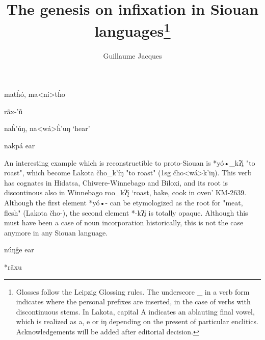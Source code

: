 \documentclass[oneside,a4paper,11pt]{article}
\newcommand{\ipa}[1]{{\phon#1}} %
\begin{document}
 

\title{The genesis on infixation in Siouan languages\footnote{Glosses follow the Leipzig Glossing rules. The underscore \_ in a verb form indicates where the personal prefixes are inserted, in the case of verbs with discontinuous stems. In Lakota, capital \ipa{A} indicates an ablauting final vowel, which is realized as \ipa{a}, \ipa{e} or \ipa{iŋ} depending on the present of particular enclitics. Acknowledgements will be added after editorial decision.}} 
 \author{Guillaume Jacques}
\maketitle
 
 
\ipa{matĥó},  \ipa{ma<ní>tĥo} 


\ipa{rãx-'ũ}

\ipa{naĥ'úŋ},  \ipa{na<wá>ĥ'uŋ} `hear'

\ipa{nakpá} ear



An interesting example which is reconstructible to proto-Siouan is *\ipa{yó•\_kʔį} "to roast", which become Lakota \ipa{čho\_k'íŋ} "to roast" (1sg \ipa{čho<wá>k'iŋ}). This verb has cognates in Hidatsa, Chiwere-Winnebago and Biloxi, and its root is discontinous also in Winnebago \ipa{roo\_kʔį́} ‘roast, bake, cook in oven’ KM-2639. Although the first element *\ipa{yó•-} can be etymologized as the root for "meat, flesh" (Lakota čho-), the second element *\ipa{-kʔį} is totally opaque. Although this must have been a case of noun incorporation historically, this is not the case anymore in any Siouan language.

\ipa{núŋǧe} ear

*\ipa{rãxu}

\citet{jacques12bear}

\citet{csd2006}

\citet{ullrich08}


 



 \tableofcontents
\end{document}
